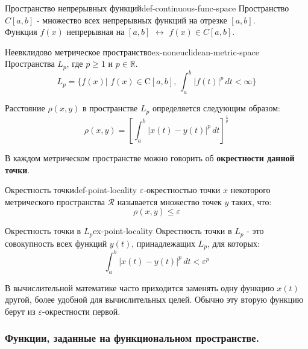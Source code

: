 \documentclass[14pt]{extarticle}
\begin{document}
        \begin{definition}{Пространство непрерывных функций}{def-continuous-func-space}
            Пространство $C[a, b]$ - множество всех непрерывных функций на отрезке $[a, b]$.\\
            Функция $f(x)$ непрерывная на $[a, b]$ $\leftrightarrow$ $f(x) \in C[a, b]$.
        \end{definition}

        \begin{example}{Неевклидово метрическое пространство}{ex-noneuclidean-metric-space}
            Пространства $L_{p}$, где $p \geq 1$ и $p \in \mathbb{R}$.
            $$L_{p} = \{f(x) \text{| } f(x) \in \text{C}[a, b] \text{, } \int_{a}^{b}|f(t)|^{p} \, dt < \infty\}$$

            Расстояние $\rho(x, y)$ в пространстве $L_{p}$ определяется следующим образом:
            $$\rho(x, y) = [\int_{a}^{b}|x(t) - y(t)|^{p} \, dt]^{\frac{1}{p}}$$
        \end{example}

        В каждом метрическом пространстве можно говорить об \textbf{окрестности данной точки}.

        \begin{definition}{Окрестность точки}{def-point-locality}
            $\varepsilon$-окрестностью точки $x$ некоторого метрического пространства $\mathscr{R}$ называется множество точек $y$ таких, что:
            $$\rho(x, y) \leq \varepsilon$$
        \end{definition}

        \begin{example}{Окрестность точки в $L_{p}$}{ex-point-locality}
            Окрестность точки в $L_{p}$ - это совокупность всех функций $y(t)$, принадлежащих $L_{p}$, для которых:
            $$\int_{a}^{b} |x(t) - y(t)|^{p} \, dt < \varepsilon^{p}$$
        \end{example}

        В вычислительной математике часто приходится заменять одну функцию $x(t)$ другой, более удобной для вычислительных целей. Обычно эту вторую функцию берут из $\varepsilon$-окрестности первой.

    \subsubsection{Функции, заданные на функциональном пространстве.}
        
\end{document}

